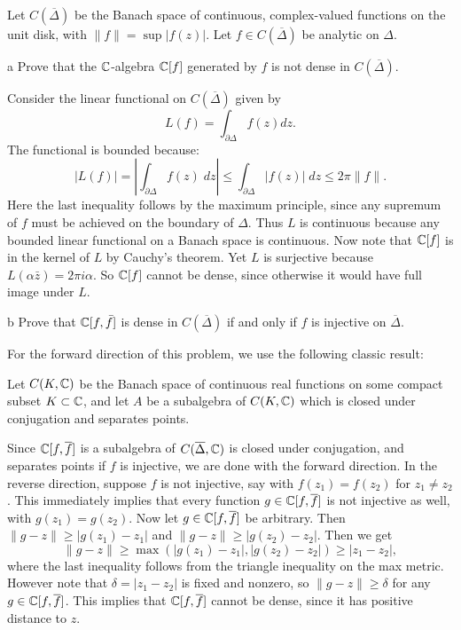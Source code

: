 \documentclass{pset}
\begin{document}
\begin{problem}{10}
    Let $C\left(\overline{\Delta}\right)$ be the Banach space of continuous, complex-valued functions on the unit disk, with $\|f\| = \sup |f(z)|$. Let $f\in C\left(\overline{\Delta}\right)$ be analytic on $\Delta.$
\end{problem}

\begin{parts}
    \begin{part}{a}
        Prove that the $\mathbb{C}$-algebra $\mathbb{C}[f]$ generated by $f$ is not dense in $C(\overline{\Delta})$.
    \end{part}
    Consider the linear functional on $C(\overline{\Delta})$ given by
    \[
        L(f) = \int_{\partial \Delta} f(z)dz
    .\] 
    The functional is bounded because:
    \[
        |L(f)| = \left|\int_{\partial \Delta} f(z)\;dz\right|\leq \int_{\partial \Delta}|f(z)|\;dz \leq 2\pi\|f\|
    .\]
    Here the last inequality follows by the maximum principle, since any supremum of $f$ must be achieved on the boundary of $\Delta$. Thus $L$ is continuous because any bounded linear functional on a Banach space is continuous. Now note that $\mathbb{C}[f]$ is in the kernel of $L$ by Cauchy's theorem. Yet $L$ is surjective because $L(\alpha\bar{z})=2\pi i\alpha$. So $\mathbb{C}[f]$ cannot be dense, since otherwise it would have full image under $L$.

    \begin{part}{b}
        Prove that $\mathbb{C}[f, \bar{f}]$ is dense in $C\left(\overline{\Delta}\right)$ if and only if $f$ is injective on $\overline{\Delta}$.
    \end{part}

    For the forward direction of this problem, we use the following classic result:
    \begin{theorem}
        Let $C(K, \mathbb{C})$ be the Banach space of continuous real functions on some compact subset $K \subset \mathbb{C}$, and let $A$ be a subalgebra of $C(K,\mathbb{C})$ which is closed under conjugation and separates points.
    \end{theorem}

    Since $\mathbb{C}[f, \overline{f}]$ is a subalgebra of $C(\overline{\Delta}, \mathbb{C})$ is closed under conjugation, and separates points if $f$ is injective, we are done with the forward direction. In the reverse direction, suppose $f$ is not injective, say with $f(z_1)=f(z_2)$ for $z_1\neq z_2$. This immediately implies that every function $g\in \mathbb{C}[f, \overline{f}]$ is not injective as well, with $g(z_1)=g(z_2)$. Now let $g\in \mathbb{C}[f, \overline{f}]$ be arbitrary. Then $\|g - z\| \geq |g(z_1) - z_1|$ and $\|g-z\|\geq |g(z_2) - z_2|$. Then we get
    \[
        \|g-z\| \geq \max(|g(z_1) - z_1|, |g(z_2)-z_2|) \geq |z_1-z_2|,
    \]
    where the last inequality follows from the triangle inequality on the max metric. However note that $\delta = |z_1-z_2|$ is fixed and nonzero, so $\|g-z\|\geq \delta$ for any $g\in \mathbb{C}[f, \overline{f}]$. This implies that $\mathbb{C}[f,\overline{f}]$ cannot be dense, since it has positive distance to $z$.


\end{parts}
\end{document}
